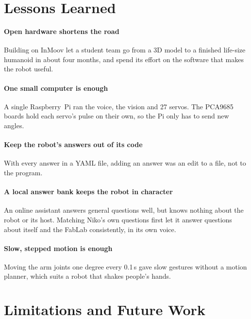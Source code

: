\documentclass[11pt]{article}
\begin{document}
\section{Lessons Learned}

\paragraph{Open hardware shortens the road} Building on InMoov let a student team go from a 3D model to a finished life-size humanoid in about four months, and spend its effort on the software that makes the robot useful.

\paragraph{One small computer is enough} A single Raspberry~Pi ran the voice, the vision and 27 servos. The PCA9685 boards hold each servo's pulse on their own, so the Pi only has to send new angles.

\paragraph{Keep the robot's answers out of its code} With every answer in a YAML file, adding an answer was an edit to a file, not to the program.

\paragraph{A local answer bank keeps the robot in character} An online assistant answers general questions well, but knows nothing about the robot or its host. Matching Niko's own questions first let it answer questions about itself and the FabLab consistently, in its own voice.

\paragraph{Slow, stepped motion is enough} Moving the arm joints one degree every 0.1\,s gave slow gestures without a motion planner, which suits a robot that shakes people's hands.

\section{Limitations and Future Work}
\label{sec:future}
\end{document}
